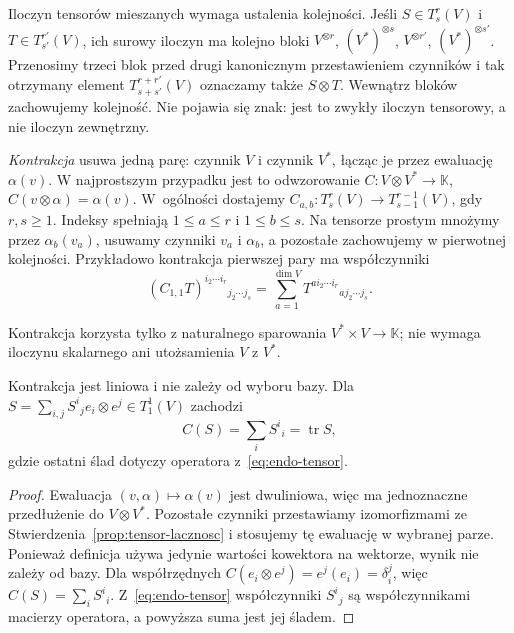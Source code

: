 Iloczyn tensorów mieszanych wymaga ustalenia kolejności.
Jeśli $S\in T^r_s(V)$ i $T\in T^{r'}_{s'}(V)$, ich surowy
iloczyn ma kolejno bloki $V^{\otimes r}$, $(V^*)^{\otimes s}$,
$V^{\otimes r'}$, $(V^*)^{\otimes s'}$. Przenosimy trzeci blok
przed drugi kanonicznym przestawieniem czynników i tak otrzymany
element $T^{r+r'}_{s+s'}(V)$ oznaczamy także $S\otimes T$.
Wewnątrz bloków zachowujemy kolejność. Nie pojawia się znak:
jest to zwykły iloczyn tensorowy, a nie iloczyn zewnętrzny.

\begin{definicja}[Kontrakcja]
\label{def:kontrakcja}
\emph{Kontrakcja} usuwa jedną parę: czynnik $V$ i czynnik $V^*$,
łącząc je przez ewaluację $\alpha(v)$. W najprostszym przypadku
jest to odwzorowanie $C\colon V\otimes V^*\to\mathbb K$,
$C(v\otimes\alpha)=\alpha(v)$. W~ogólności dostajemy
$C_{a,b}\colon T^r_s(V)\to T^{r-1}_{s-1}(V)$, gdy $r,s\geq1$.
Indeksy spełniają $1\leq a\leq r$ i $1\leq b\leq s$.
Na tensorze prostym mnożymy przez $\alpha_b(v_a)$,
usuwamy czynniki $v_a$ i $\alpha_b$, a pozostałe zachowujemy
w pierwotnej kolejności. Przykładowo kontrakcja pierwszej pary ma współczynniki
\[
 (C_{1,1}T)^{i_2\cdots i_r}{}_{j_2\cdots j_s}
 =\sum_{a=1}^{\dim V}T^{a i_2\cdots i_r}{}_{a j_2\cdots j_s}.
\]
\end{definicja}

Kontrakcja korzysta tylko z naturalnego sparowania
$V^*\times V\to\mathbb K$; nie wymaga iloczynu skalarnego
ani utożsamienia $V$ z $V^*$.

\begin{stwierdzenie}
\label{prop:kontrakcja-slad}
Kontrakcja jest liniowa i nie zależy od wyboru bazy. Dla
$S=\sum_{i,j}S^i{}_j e_i\otimes e^j\in T^1_1(V)$ zachodzi
\[
 C(S)=\sum_i S^i{}_i=\operatorname{tr}S,
\]
gdzie ostatni ślad dotyczy operatora z~\eqref{eq:endo-tensor}.
\end{stwierdzenie}
\begin{proof}
Ewaluacja $(v,\alpha)\mapsto\alpha(v)$ jest dwuliniowa,
więc ma jednoznaczne przedłużenie do $V\otimes V^*$.
Pozostałe czynniki przestawiamy izomorfizmami ze
Stwierdzenia~\ref{prop:tensor-lacznosc} i stosujemy tę ewaluację
w wybranej parze. Ponieważ definicja używa jedynie wartości
kowektora na wektorze, wynik nie zależy od bazy.
Dla współrzędnych $C(e_i\otimes e^j)=e^j(e_i)=\delta_i^j$,
więc $C(S)=\sum_i S^i{}_i$. Z~\eqref{eq:endo-tensor}
współczynniki $S^i{}_j$ są współczynnikami macierzy operatora,
a powyższa suma jest jej śladem.
\end{proof}

